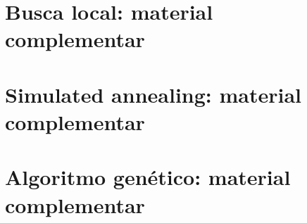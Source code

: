 
\appendices

\section{Busca local: material complementar}
\label{anexo:busca-local}

\section{Simulated annealing: material complementar}
\label{anexo:tempera}

\section{Algoritmo genético: material complementar}
\label{anexo:genetico}
